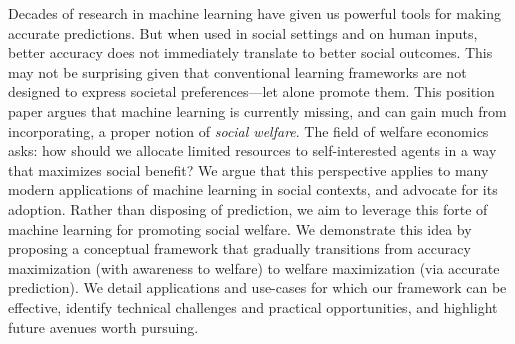 
Decades of research in machine learning have given us powerful tools for making accurate predictions.
But when used in social settings and on human inputs,
better accuracy does not immediately translate to better social outcomes.
This may not be surprising given that conventional learning frameworks
are not designed to express societal preferences---let alone promote them.
This position paper argues that machine learning is currently missing,
and can gain much from incorporating,
a proper notion of \emph{social welfare}.
The field of  welfare economics asks:
how should we allocate limited resources to self-interested agents in a way that maximizes social benefit?
We argue that this perspective applies to %
many modern applications of machine learning in social contexts,
and advocate for its adoption.
Rather than disposing of prediction,
we aim to leverage this forte of machine learning
for promoting social welfare.
We demonstrate this idea by proposing a conceptual framework that gradually transitions from accuracy maximization (with awareness to welfare)
to welfare maximization (via accurate prediction). 
We detail applications and use-cases for which our framework can be effective,
identify technical challenges and practical opportunities,
and highlight future avenues worth pursuing.



